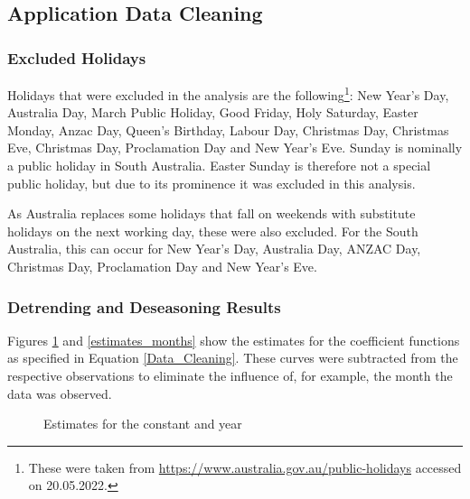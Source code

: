 \documentclass[12pt, a4paper]{article}
\theoremstyle{MAstyle} \newtheorem{assumption}{Assumption}[section]
\theoremstyle{MAstyle} \newtheorem{definition}{Definition}[section]
\theoremstyle{MAstyle} \newtheorem{theorem}{Theorem}[section]
\begin{document}
			
		\subsection{Application Data Cleaning}\label{Application_Appendix}
			\subsubsection{Excluded Holidays}
			Holidays that were excluded in the analysis are the following\footnote{These were taken from \url{https://www.australia.gov.au/public-holidays} accessed on 20.05.2022.}: New Year's Day, Australia Day, March Public Holiday, Good Friday, Holy Saturday, Easter Monday, Anzac Day, Queen's Birthday, Labour Day, Christmas Day, Christmas Eve, Christmas Day, Proclamation Day and New Year's Eve. Sunday is nominally a public holiday in South Australia. Easter Sunday is therefore not a special public holiday, but due to its prominence it was excluded in this analysis.
			
			As Australia replaces some holidays that fall on weekends with substitute holidays on the next working day, these were also excluded. For the South Australia, this can occur for New Year's Day, Australia Day, ANZAC Day, Christmas Day, Proclamation Day and New Year's Eve.
		
			\subsubsection{Detrending and Deseasoning Results}\label{detrending}
			Figures \ref{estimates_const_year} and \ref{estimates_months} show the estimates for the coefficient functions as specified in Equation \ref{Data_Cleaning}. These curves were subtracted from the respective observations to eliminate the influence of, for example, the month the data was observed.
			\begin{figure}[H]
				\caption{Estimates for the constant and year}
				\label{estimates_const_year}
			\end{figure}
			
\end{document}
